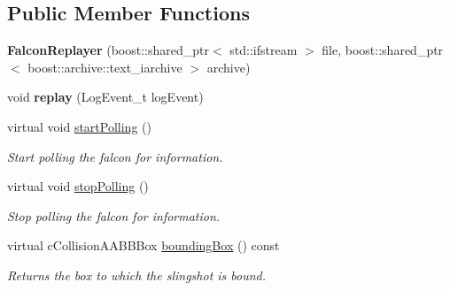 \subsection*{Public Member Functions}
\begin{DoxyCompactItemize}
\item 
\hypertarget{classFalconReplayer_a8b0921f53e7c34181b9ee8120070acea}{
{\bfseries FalconReplayer} (boost::shared\_\-ptr$<$ std::ifstream $>$ file, boost::shared\_\-ptr$<$ boost::archive::text\_\-iarchive $>$ archive)}
\label{classFalconReplayer_a8b0921f53e7c34181b9ee8120070acea}

\item 
\hypertarget{classFalconReplayer_a831a6e87b2497f0c1af4bc7fd5ed7d54}{
void {\bfseries replay} (LogEvent\_\-t logEvent)}
\label{classFalconReplayer_a831a6e87b2497f0c1af4bc7fd5ed7d54}

\item 
\hypertarget{classFalconReplayer_ad75b679b3c287c4d53041988e7a0ab45}{
virtual void \hyperlink{classFalconReplayer_ad75b679b3c287c4d53041988e7a0ab45}{startPolling} ()}
\label{classFalconReplayer_ad75b679b3c287c4d53041988e7a0ab45}

\begin{DoxyCompactList}\small\item\em Start polling the falcon for information. \item\end{DoxyCompactList}\item 
\hypertarget{classFalconReplayer_a1487ef2142d0a4748f44f78e1356cffa}{
virtual void \hyperlink{classFalconReplayer_a1487ef2142d0a4748f44f78e1356cffa}{stopPolling} ()}
\label{classFalconReplayer_a1487ef2142d0a4748f44f78e1356cffa}

\begin{DoxyCompactList}\small\item\em Stop polling the falcon for information. \item\end{DoxyCompactList}\item 
virtual cCollisionAABBBox \hyperlink{classFalconReplayer_a9ecce406249112f611f72530e942e881}{boundingBox} () const 
\begin{DoxyCompactList}\small\item\em Returns the box to which the slingshot is bound. \item\end{DoxyCompactList}\end{DoxyCompactItemize}


